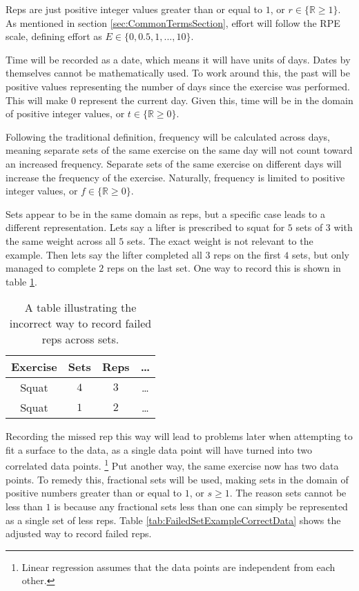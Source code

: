 Reps are just positive integer values greater than or equal to $1$, or $r\in \{ \mathbb{R}\ge 1 \}$. As mentioned in section \ref{sec:CommonTermsSection}, effort will follow the RPE scale, defining effort as $E\in \{0,0.5,1,...,10\}$.

Time will be recorded as a date, which means it will have units of days. Dates by themselves cannot be mathematically used. To work around this, the past will be positive values representing the number of days since the exercise was performed. This will make $0$ represent the current day. Given this, time will be in the domain of positive integer values, or $t\in \{ \mathbb{R}\ge 0 \}$.

Following the traditional definition, frequency will be calculated across days, meaning separate sets of the same exercise on the same day will not count toward an increased frequency. Separate sets of the same exercise on different days will increase the frequency of the exercise. Naturally, frequency is limited to positive integer values, or $f\in \{ \mathbb{R}\ge 0 \}$.

Sets appear to be in the same domain as reps, but a specific case leads to a different representation. Lets say a lifter is prescribed to squat for $5$ sets of $3$ with the same weight across all $5$ sets. The exact weight is not relevant to the example. Then lets say the lifter completed all $3$ reps on the first $4$ sets, but only managed to complete $2$ reps on the last set. One way to record this is shown in table \ref{tab:FailedSetExampleIncorrectData}.

\begin{table}[h]
    \centering
    \begin{tabular}{c|c|c|c}
        Exercise & Sets & Reps & \dots \\
        \hline
        Squat & $4$ & $3$ & \dots \\
        Squat & $1$ & $2$ & \dots \\ 
    \end{tabular}
    \caption{A table illustrating the incorrect way to record failed reps across sets.}
    \label{tab:FailedSetExampleIncorrectData}
\end{table}

Recording the missed rep this way will lead to problems later when attempting to fit a surface to the data, as a single data point will have turned into two correlated data points. \footnote{Linear regression assumes that the data points are independent from each other.} Put another way, the same exercise now has two data points. To remedy this, fractional sets will be used, making sets in the domain of positive numbers greater than or equal to $1$, or $s\ge 1$. The reason sets cannot be less than $1$ is because any fractional sets less than one can simply be represented as a single set of less reps. Table \ref{tab:FailedSetExampleCorrectData} shows the adjusted way to record failed reps.

